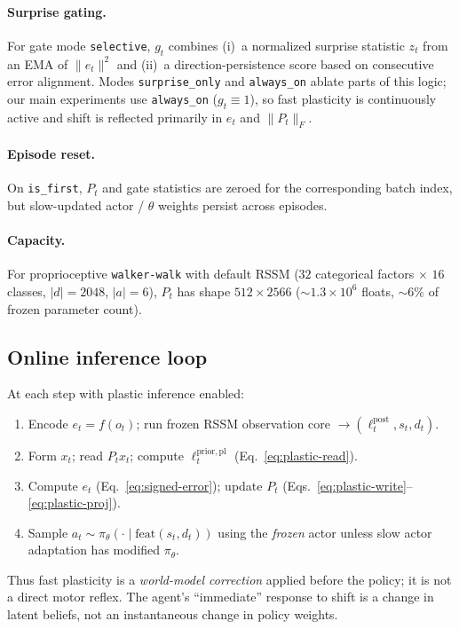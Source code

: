 \paragraph{Surprise gating.}
For gate mode \texttt{selective}, $g_t$ combines (i)~a normalized surprise statistic $z_t$ from an EMA of $\|e_t\|^2$ and (ii)~a direction-persistence score based on consecutive error alignment.
Modes \texttt{surprise\_only} and \texttt{always\_on} ablate parts of this logic; our main experiments use \texttt{always\_on} ($g_t \equiv 1$), so fast plasticity is continuously active and shift is reflected primarily in $e_t$ and $\|P_t\|_F$.

\paragraph{Episode reset.}
On \texttt{is\_first}, $P_t$ and gate statistics are zeroed for the corresponding batch index, but slow-updated actor / $\theta$ weights persist across episodes.

\paragraph{Capacity.}
For proprioceptive \texttt{walker-walk} with default RSSM ($32$ categorical factors $\times$ $16$ classes, $|d|=2048$, $|a|=6$), $P_t$ has shape $512 \times 2566$ (${\sim}1.3\times10^6$ floats, ${\sim}6\%$ of frozen parameter count).

\subsection{Online inference loop}
\label{sec:inference}

At each step with plastic inference enabled:
\begin{enumerate}[leftmargin=*, itemsep=1pt]
  \item Encode $e_t = f(o_t)$; run frozen RSSM observation core $\rightarrow (\ell^{\mathrm{post}}_t, s_t, d_t)$.
  \item Form $x_t$; read $P_t x_t$; compute $\ell^{\mathrm{prior,pl}}_t$ (Eq.~\eqref{eq:plastic-read}).
  \item Compute $e_t$ (Eq.~\eqref{eq:signed-error}); update $P_t$ (Eqs.~\eqref{eq:plastic-write}--\eqref{eq:plastic-proj}).
  \item Sample $a_t \sim \pi_\theta(\cdot \mid \mathrm{feat}(s_t, d_t))$ using the \emph{frozen} actor unless slow actor adaptation has modified $\pi_\theta$.
\end{enumerate}
Thus fast plasticity is a \emph{world-model correction} applied before the policy; it is not a direct motor reflex.
The agent's ``immediate'' response to shift is a change in latent beliefs, not an instantaneous change in policy weights.

